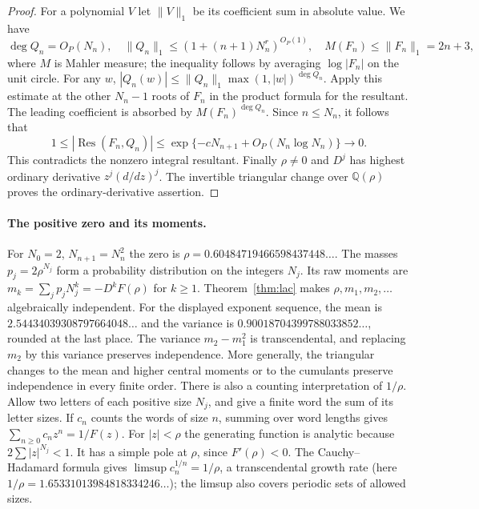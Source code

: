 \documentclass[11pt,a4paper]{article}
\theoremstyle{definition}
\theoremstyle{remark}
\newcommand{\Q}{\mathbb Q}
\DeclareMathOperator{\Res}{Res}
\numberwithin{equation}{section}
\begin{document}
\begin{proof}
For a polynomial $V$ let $\|V\|_1$ be its coefficient sum in absolute value. We have
\[
  \deg Q_n=O_P(N_n),\quad
  \|Q_n\|_1\le (1+(n+1)N_n^r)^{O_P(1)},\quad
  M(F_n)\le\|F_n\|_1=2n+3,
\]
where $M$ is Mahler measure; the inequality follows by averaging $\log|F_n|$ on the unit circle. For any $w$, $|Q_n(w)|\le\|Q_n\|_1\max(1,|w|)^{\deg Q_n}$. Apply this estimate at the other $N_n-1$ roots of $F_n$ in the product formula for the resultant. The leading coefficient is absorbed by $M(F_n)^{\deg Q_n}$. Since $n\le N_n$, it follows that
\[
 1\le |\Res(F_n,Q_n)|\le
 \exp\{-cN_{n+1}+O_P(N_n\log N_n)\}
 \longrightarrow0 .
\]
This contradicts the nonzero integral resultant. Finally $\rho\ne0$ and $D^j$ has highest ordinary derivative $z^j(d/dz)^j$. The invertible triangular change over $\Q(\rho)$ proves the ordinary-derivative assertion.
\end{proof}

\paragraph{The positive zero and its moments.}
For $N_0=2$, $N_{n+1}=N_n^2$ the zero is
$\rho=0.60484719466598437448\ldots$. The masses
$p_j=2\rho^{N_j}$ form a probability distribution on the integers $N_j$.
Its raw moments are $m_k=\sum_j p_jN_j^k=-D^kF(\rho)$ for $k\ge1$.
Theorem~\ref{thm:lac} makes $\rho,m_1,m_2,\ldots$ algebraically independent.
For the displayed exponent sequence, the mean is $2.54434039308797664048\ldots$ and the variance is $0.90018704399788033852\ldots$, rounded at the last place. The variance $m_2-m_1^2$ is transcendental, and replacing $m_2$ by this variance preserves independence. More generally, the triangular changes to the mean and higher central moments or to the cumulants preserve independence in every finite order. There is also a counting interpretation of $1/\rho$. Allow two letters of each positive size $N_j$, and give a finite word the sum of its letter sizes. If $c_n$ counts the words of size $n$, summing over word lengths gives $\sum_{n\ge0}c_nz^n=1/F(z)$. For $|z|<\rho$ the generating function is analytic because $2\sum |z|^{N_j}<1$. It has a simple pole at $\rho$, since $F'(\rho)<0$. The Cauchy--Hadamard formula gives $\limsup c_n^{1/n}=1/\rho$, a transcendental growth rate (here $1/\rho=1.65331013984818334246\ldots$); the limsup also covers periodic sets of allowed sizes.
\end{document}
